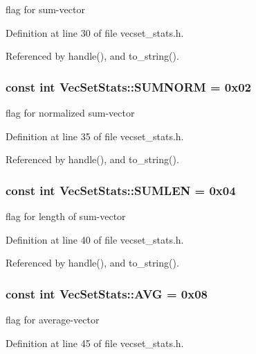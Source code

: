 flag for sum-vector 

Definition at line 30 of file vecset\_\-stats.h.

Referenced by handle(), and to\_\-string().\hypertarget{class_vec_set_stats_5c6b167522f05f04d0357f9c525404ed}{
\subsubsection[SUMNORM]{\setlength{\rightskip}{0pt plus 5cm}const int {\bf VecSetStats::SUMNORM} = 0x02}}
\label{class_vec_set_stats_5c6b167522f05f04d0357f9c525404ed}


flag for normalized sum-vector 

Definition at line 35 of file vecset\_\-stats.h.

Referenced by handle(), and to\_\-string().\hypertarget{class_vec_set_stats_1a5991a18254611aec6ea124f916b650}{
\subsubsection[SUMLEN]{\setlength{\rightskip}{0pt plus 5cm}const int {\bf VecSetStats::SUMLEN} = 0x04}}
\label{class_vec_set_stats_1a5991a18254611aec6ea124f916b650}


flag for length of sum-vector 

Definition at line 40 of file vecset\_\-stats.h.

Referenced by handle(), and to\_\-string().\hypertarget{class_vec_set_stats_8d4885dfc7b4e4d631e12b1031dabfa8}{
\subsubsection[AVG]{\setlength{\rightskip}{0pt plus 5cm}const int {\bf VecSetStats::AVG} = 0x08}}
\label{class_vec_set_stats_8d4885dfc7b4e4d631e12b1031dabfa8}


flag for average-vector 

Definition at line 45 of file vecset\_\-stats.h.


